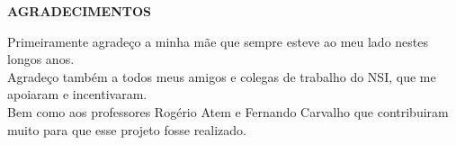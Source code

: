 \begin{center}
\textbf{AGRADECIMENTOS}
\end{center}

Primeiramente agradeço a minha mãe que sempre esteve ao meu lado nestes longos anos. \\
Agradeço também a todos meus amigos e colegas de trabalho do NSI, que me apoiaram e incentivaram. \\
Bem como aos professores Rogério Atem e Fernando Carvalho que contribuiram muito para que esse projeto fosse realizado.
